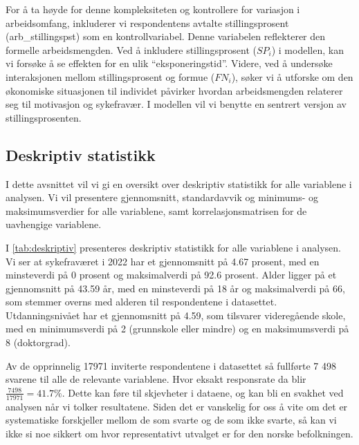 \documentclass[
  12pt,
  a4paper,
  DIV=11,
  numbers=noendperiod]{scrartcl}
\begin{document}
For å ta høyde for denne kompleksiteten og kontrollere for variasjon i
arbeidsomfang, inkluderer vi respondentens avtalte stillingsprosent
(arb\_stillingspst) som en kontrollvariabel. Denne variabelen
reflekterer den formelle arbeidsmengden. Ved å inkludere
stillingsprosent (\(SP_i\)) i modellen, kan vi forsøke å se effekten for
en ulik ``eksponeringstid''. Videre, ved å undersøke interaksjonen
mellom stillingsprosent og formue (\(FN_i\)), søker vi å utforske om den
økonomiske situasjonen til individet påvirker hvordan arbeidsmengden
relaterer seg til motivasjon og sykefravær. I modellen vil vi benytte en
sentrert versjon av stillingsprosenten.

\subsection{Deskriptiv statistikk}\label{deskriptiv-statistikk}

I dette avsnittet vil vi gi en oversikt over deskriptiv statistikk for
alle variablene i analysen. Vi vil presentere gjennomsnitt,
standardavvik og minimums- og maksimumsverdier for alle variablene, samt
korrelasjonsmatrisen for de uavhengige variablene.

I \autoref{tab:deskriptiv} presenteres deskriptiv statistikk for alle
variablene i analysen. Vi ser at sykefraværet i 2022 har et gjennomsnitt
på 4.67 prosent, med en minsteverdi på 0 prosent og maksimalverdi på
92.6 prosent. Alder ligger på et gjennomsnitt på 43.59 år, med en
minsteverdi på 18 år og maksimalverdi på 66, som stemmer overns med
alderen til respondentene i datasettet. Utdanningsnivået har et
gjennomsnitt på 4.59, som tilsvarer videregående skole, med en
minimumsverdi på 2 (grunnskole eller mindre) og en maksimumsverdi på 8
(doktorgrad).

Av de opprinnelig 17971 inviterte respondentene i datasettet så
fullførte 7 498 svarene til alle de relevante variablene. Hvor eksakt
responsrate da blir \(\frac{7498}{17971} = 41.7\%\). Dette kan føre til
skjevheter i dataene, og kan bli en svakhet ved analysen når vi tolker
resultatene. Siden det er vanskelig for oss å vite om det er
systematiske forskjeller mellom de som svarte og de som ikke svarte, så
kan vi ikke si noe sikkert om hvor representativt utvalget er for den
norske befolkningen.
\end{document}

